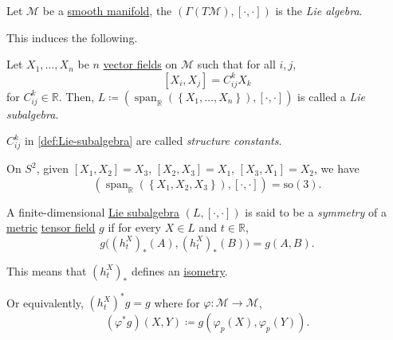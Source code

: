 \begin{definition}\label{def:Lie-algebra*}
	Let \(\mathcal{M} \) be a \hyperref[def:smooth-manifold]{smooth manifold}, the \((\Gamma (T\mathcal{M} ), [\cdot, \cdot])\) is the \emph{Lie algebra}.
\end{definition}

This induces the following.

\begin{definition}\label{def:Lie-subalgebra}
	Let \(X_1, \dots , X_n\) be \(n\) \hyperref[def:vector-field]{vector fields} on \(\mathcal{M} \) such that for all \(i, j\),
	\[
		[X_i, X_j] = C^k_{ij} X_k
	\]
	for \(C^k_{ij}\in \mathbb{R}  \). Then, \(L\coloneqq (\mathop{\mathrm{span}}_\mathbb{R} (\left\{ X_1, \dots , X_n \right\} ), [\cdot, \cdot] )\) is called a \emph{Lie subalgebra}.
\end{definition}

\begin{notation}\label{not:structure-constant}
	\(C^k_{ij} \) in \autoref{def:Lie-subalgebra} are called \emph{structure constants}.
\end{notation}

\begin{eg}
	On \(S^2\), given \([X_1, X_2] = X_3\), \([X_2, X_3] = X_1\), \([X_3, X_1] = X_2\), we have
	\[
		\left( \mathop{\mathrm{span}}\nolimits_{\mathbb{R} }(\left\{ X_1, X_2, X_3 \right\} ), [\cdot, \cdot] \right) = \mathrm{so}(3).
	\]
\end{eg}

\begin{definition}[Symmetry]\label{def:symmetry}
	A finite-dimensional \hyperref[def:Lie-subalgebra]{Lie subalgebra} \((L, [\cdot, \cdot])\) is said to be a \emph{symmetry} of a \hyperref[def:pseudo-Riemannian-metric]{metric} \hyperref[def:tensor-field]{tensor field} \(g\) if for every \(X\in L\) and \(t\in \mathbb{R} \),
	\[
		g\big( (h^X_t )_{\ast} (A), (h^X_t )_{\ast} (B) \big) = g(A, B).
	\]
\end{definition}

This means that \((h^X_t)_{\ast} \) defines an \hyperref[def:isometry]{isometry}.

\begin{note}
	Or equivalently, \((h^X_t)^{\ast} g = g\) where for \(\varphi \colon \mathcal{M} \to \mathcal{M} \),
	\[
		(\varphi ^{\ast} g)(X, Y) \coloneqq g(\varphi _p (X), \varphi _p(Y)).
	\]
\end{note}

